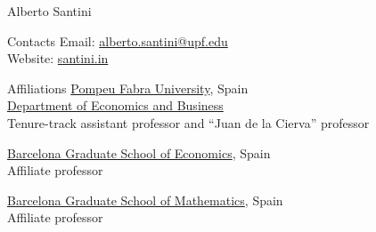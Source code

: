 \documentclass[12pt]{article}
\newcommand{\cvImportant}[1]{\textcolor{cvblue}{#1}}
\begin{document}

  {\huge\TitleFont Alberto Santini}

  \vspace{2em}

  \begin{paracol}{2}
    {\TitleFont Contacts}
  \switchcolumn
    Email: \href{mailto:alberto.santini@upf.edu}{alberto.santini@upf.edu}\\
    Website: \href{https://santini.in/}{santini.in}
  \end{paracol}

  \vspace{0.5em}

  \begin{paracol}{2}
    {\TitleFont Affiliations}
  \switchcolumn
    \cvImportant{\href{https://www.upf.edu/}{Pompeu Fabra University}, Spain}\\
    \href{https://www.upf.edu/en/web/econ/entry/-/-/153125/adscripcion/alberto-santini}{Department of Economics and Business}\\
    Tenure-track assistant professor and ``Juan de la Cierva'' professor

    \cvImportant{\href{https://www.barcelonagse.eu/people/santini-alberto}{Barcelona Graduate School of Economics}, Spain}\\
    Affiliate professor

    \cvImportant{\href{https://bgsmath.cat/people/?person=alberto-santini}{Barcelona Graduate School of Mathematics}, Spain}\\
    Affiliate professor
  \end{paracol}

  
  
  
  
  
  
  
  
  
\end{document}
